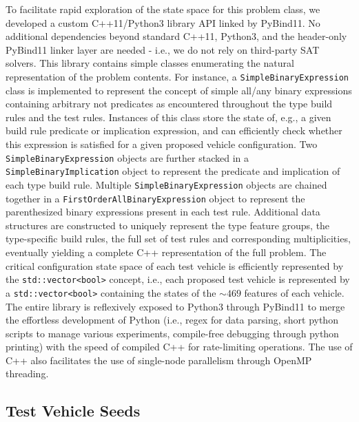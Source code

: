 \documentclass[aps,prl,twocolumn,superscriptaddress,groupedaddress]{revtex4}  %
\begin{document}
To facilitate rapid exploration of the state space for this problem class, we
developed a custom C++11/Python3 library API linked by PyBind11. No additional
dependencies beyond standard C++11, Python3, and the header-only PyBind11 linker
layer are needed - i.e., we do not rely on third-party SAT solvers. This library
contains simple classes enumerating the natural representation of the problem
contents. For instance, a \texttt{SimpleBinaryExpression} class is implemented
to represent the concept of simple all/any binary expressions containing
arbitrary not predicates as encountered throughout the type build rules and the
test rules. Instances of this class store the state of, e.g., a given build rule
predicate or implication expression, and can efficiently check whether this
expression is satisfied for a given proposed vehicle configuration. Two
\texttt{SimpleBinaryExpression} objects are further stacked in a
\texttt{SimpleBinaryImplication} object to represent the predicate and
implication of each type build rule. Multiple \texttt{SimpleBinaryExpression}
objects are chained together in a \texttt{FirstOrderAllBinaryExpression} object
to represent the parenthesized binary expressions present in each test rule.
Additional data structures are constructed to uniquely represent the type
feature groups, the type-specific build rules, the full set of test rules and
corresponding multiplicities, eventually yielding a complete C++ representation
of the full problem. The critical configuration state space of each test vehicle
is efficiently represented by the \texttt{std::vector<bool>} concept, i.e., each
proposed test vehicle is represented by a \texttt{std::vector<bool>} containing the
states of the $\sim 469$ features of each vehicle.
 The entire library is reflexively exposed to Python3 through PyBind11 to merge
the effortless development of Python (i.e., regex for data parsing, short python
scripts to manage various experiments, compile-free debugging through python
printing) with the speed of compiled C++ for rate-limiting operations. The use
of C++ also facilitates the use of single-node parallelism through OpenMP
threading.

\subsection{Test Vehicle Seeds}
\end{document}
